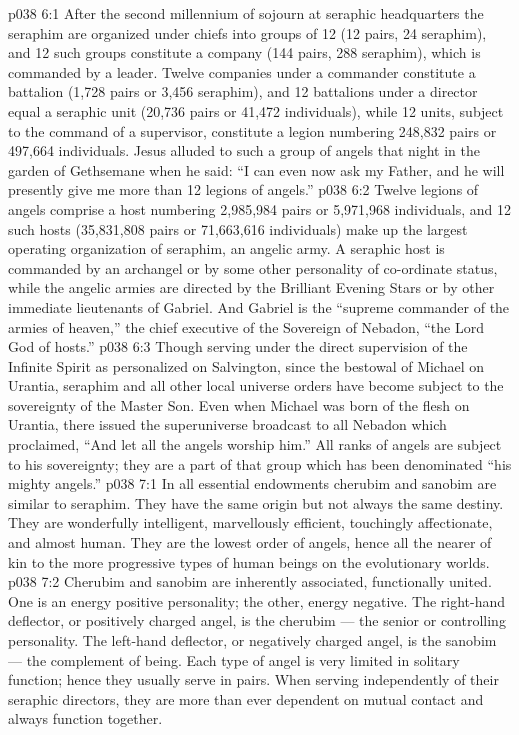 \vs p038 6:1 After the second millennium of sojourn at seraphic headquarters the seraphim are organized under chiefs into groups of 12 (12 pairs, 24 seraphim), and 12 such groups constitute a company (144 pairs, 288 seraphim), which is commanded by a leader. Twelve companies under a commander constitute a battalion (1,728 pairs or 3,456 seraphim), and 12 battalions under a director equal a seraphic unit (20,736 pairs or 41,472 individuals), while 12 units, subject to the command of a supervisor, constitute a legion numbering 248,832 pairs or 497,664 individuals. Jesus alluded to such a group of angels that night in the garden of Gethsemane when he said: “I can even now ask my Father, and he will presently give me more than 12 legions of angels.”
\vs p038 6:2 Twelve legions of angels comprise a host numbering 2,985,984 pairs or 5,971,968 individuals, and 12 such hosts (35,831,808 pairs or 71,663,616 individuals) make up the largest operating organization of seraphim, an angelic army. A seraphic host is commanded by an archangel or by some other personality of co\hyp{}ordinate status, while the angelic armies are directed by the Brilliant Evening Stars or by other immediate lieutenants of Gabriel. And Gabriel is the “supreme commander of the armies of heaven,” the chief executive of the Sovereign of Nebadon, “the Lord God of hosts.”
\vs p038 6:3 Though serving under the direct supervision of the Infinite Spirit as personalized on Salvington, since the bestowal of Michael on Urantia, seraphim and all other local universe orders have become subject to the sovereignty of the Master Son. Even when Michael was born of the flesh on Urantia, there issued the superuniverse broadcast to all Nebadon which proclaimed, “And let all the angels worship him.” All ranks of angels are subject to his sovereignty; they are a part of that group which has been denominated “his mighty angels.”
\vs p038 7:1 In all essential endowments cherubim and sanobim are similar to seraphim. They have the same origin but not always the same destiny. They are wonderfully intelligent, marvellously efficient, touchingly affectionate, and almost human. They are the lowest order of angels, hence all the nearer of kin to the more progressive types of human beings on the evolutionary worlds.
\vs p038 7:2 Cherubim and sanobim are inherently associated, functionally united. One is an energy positive personality; the other, energy negative. The right\hyp{}hand deflector, or positively charged angel, is the cherubim --- the senior or controlling personality. The left\hyp{}hand deflector, or negatively charged angel, is the sanobim --- the complement of being. Each type of angel is very limited in solitary function; hence they usually serve in pairs. When serving independently of their seraphic directors, they are more than ever dependent on mutual contact and always function together.
